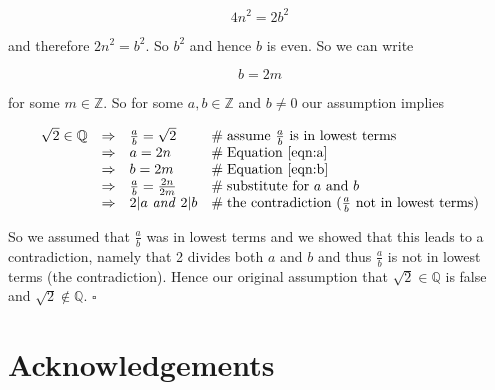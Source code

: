 \documentclass[11pt, oneside]{article}   	%
\theoremstyle{definition}
\begin{document}
\begin{equation*}
4 n^2 = 2 b^2
\end{equation*}

\bigskip
\noindent
and therefore $2n^2 = b^2$. So $b^2$ and hence $b$ is even. So we can write

\begin{equation}
 b = 2 m
 \label{eqn:b}
 \end{equation}

 \bigskip
 \noindent
 for some $m \in \mathbb{Z}$. So for some $a,b \in \mathbb{Z}$ and  $b \neq 0$ our assumption implies


\begin{equation*}
\begin{array}{llll}
\sqrt{2} \in \mathbb{Q} 
&\Rightarrow& \frac{a}{b} = \sqrt{2}                               &\mathrel{\#} \text{assume $\frac{a}{b}$ is in lowest terms} \\
&\Rightarrow& a = 2n                                                     &\mathrel{\#} \text{Equation } \ref{eqn:a} \\
&\Rightarrow& b = 2m                                                  &\mathrel{\#} \text{Equation } \ref{eqn:b} \\
&\Rightarrow& \frac{a}{b}  = \frac{2n}{2m}                     &\mathrel{\#} \text{substitute for $a$ and $b$} \\
&\Rightarrow& \text{$2|a$ \emph{and} $2|b$}               &\mathrel{\#} \text{the contradiction ($\frac{a}{b}$ not in lowest terms)}
\end{array}
\end{equation*}

\bigskip
\noindent
So we assumed that $\frac{a}{b}$ was in lowest terms and we showed that this leads to a contradiction,  namely that 2 divides both $a$ and $b$
and thus $\frac{a}{b}$ is not in lowest terms (the contradiction). Hence our original assumption that $\sqrt{2} \in \mathbb{Q}$ is false and
$\sqrt{2} \notin \mathbb{Q}$. $\square$

\newpage
\section{Acknowledgements}



\end{document}
